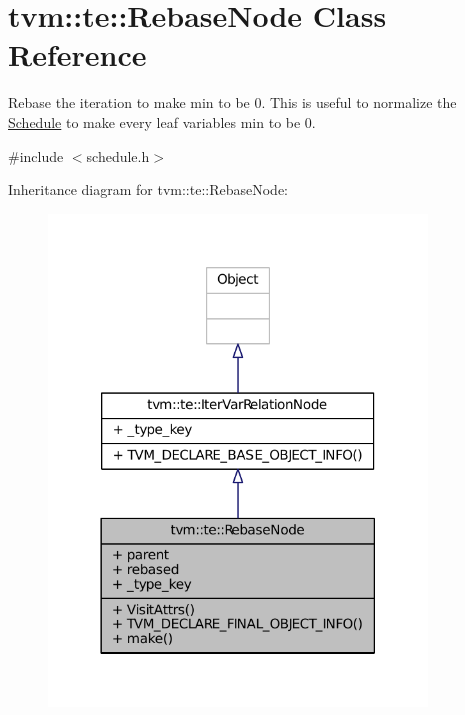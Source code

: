 \hypertarget{classtvm_1_1te_1_1RebaseNode}{}\section{tvm\+:\+:te\+:\+:Rebase\+Node Class Reference}
\label{classtvm_1_1te_1_1RebaseNode}


Rebase the iteration to make min to be 0. This is useful to normalize the \hyperlink{classtvm_1_1te_1_1Schedule}{Schedule} to make every leaf variable\textquotesingle{}s min to be 0.  




{\ttfamily \#include $<$schedule.\+h$>$}



Inheritance diagram for tvm\+:\+:te\+:\+:Rebase\+Node\+:
\nopagebreak
\begin{figure}[H]
\begin{center}
\leavevmode
\includegraphics[width=285pt]{classtvm_1_1te_1_1RebaseNode__inherit__graph}
\end{center}
\end{figure}


